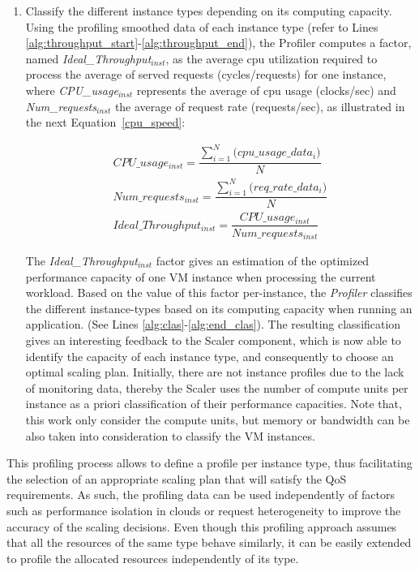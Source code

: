 \begin{enumerate}
\item Classify the different instance types depending on its computing capacity. Using the profiling smoothed data of each instance type (refer to Lines \ref{alg:throughput_start}-\ref{alg:throughput_end}), the Profiler computes a factor, named \emph{Ideal\_Throughput$_{inst}$}, as the average cpu utilization required to process the average of served requests (cycles/requests) for one instance, where \emph{CPU\_usage$_{inst}$} represents the average of  cpu usage (clocks/sec) and \emph{Num\_requests$_{inst}$} the average of request rate (requests/sec), as illustrated in the next Equation~\ref{cpu_speed}:

{\scriptsize
\begin{equation}\label{cpu_speed}
\begin{split}
CPU\_usage_{inst} = \dfrac{   \sum_{i=1}^N \big( cpu\_usage\_data_{i}  \big) } { N } \\
Num\_requests_{inst} = \dfrac{   \sum_{i=1}^N \big( req\_rate\_data_{i} \big) } { N } \\
Ideal\_Throughput_{inst} =\dfrac{   CPU\_usage_{inst}  } {  Num\_requests_{inst}  } 
\end{split}
\end{equation}
}

The \emph{Ideal\_Throughput$_{inst}$} factor gives an estimation of the optimized performance capacity of one VM instance when processing the current workload. Based on the value of this factor per-instance, the \emph{Profiler} classifies the different instance-types based on its computing capacity when running an application. (See Lines \ref{alg:clas}-\ref{alg:end_clas}). The resulting classification gives an interesting feedback to the Scaler component, which is now able to identify the capacity of each instance type, and consequently to choose an optimal scaling plan. Initially, there are not instance profiles due to the lack of monitoring data, thereby the Scaler uses the number of compute units per instance as a priori classification of their performance capacities. Note that, this work only consider the compute units, but memory or bandwidth can be also taken into consideration to classify the VM instances.
\end{enumerate}

This profiling process allows to define a profile per instance type, thus facilitating the selection of an appropriate scaling plan that will satisfy the QoS requirements. As such, the profiling data can be used independently of factors such as performance isolation in clouds or request heterogeneity to improve the accuracy of the scaling decisions. Even though this profiling approach assumes that all the resources of the same type behave similarly, it can be easily extended to profile the allocated resources independently of its type.



